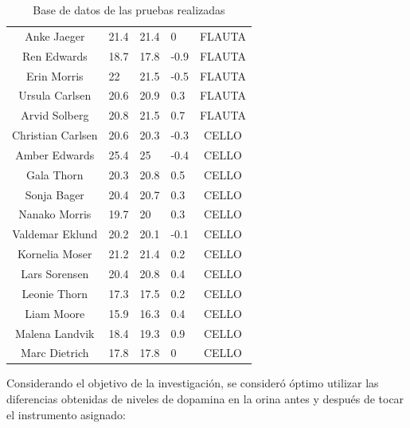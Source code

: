 \begin{table}[H]
\begin{center}
\begin{tabular}{|c |p{2.5cm} |p{2.5cm} |p{3cm}|c|}
            Anke Jaeger & 21.4 & 21.4 & 0 & FLAUTA \\
            Ren Edwards & 18.7 & 17.8 & -0.9 & FLAUTA \\
            Erin Morris & 22 & 21.5 & -0.5 & FLAUTA \\
            Ursula Carlsen & 20.6 & 20.9 & 0.3 & FLAUTA \\
            Arvid Solberg & 20.8 & 21.5 & 0.7 & FLAUTA \\
            Christian Carlsen & 20.6 & 20.3 & -0.3 & CELLO \\
            Amber Edwards & 25.4 & 25 & -0.4 & CELLO \\
            Gala Thorn & 20.3 & 20.8 & 0.5 & CELLO \\
            Sonja Bager & 20.4 & 20.7 & 0.3 & CELLO \\
            Nanako Morris & 19.7 & 20 & 0.3 & CELLO \\
            Valdemar Eklund & 20.2 & 20.1 & -0.1 & CELLO \\
            Kornelia Moser & 21.2 & 21.4 & 0.2 & CELLO \\
            Lars Sorensen & 20.4 & 20.8 & 0.4 & CELLO \\
            Leonie Thorn & 17.3 & 17.5 & 0.2 & CELLO \\
            Liam Moore & 15.9 & 16.3 & 0.4 & CELLO \\
            Malena Landvik & 18.4 & 19.3 & 0.9 & CELLO \\
            Marc Dietrich & 17.8 & 17.8 & 0 & CELLO \\
            \hline
        \end{tabular}
        \caption{Base de datos de las pruebas realizadas}
    \end{center}
\end{table}


Considerando el objetivo de la investigación, se consideró óptimo utilizar las diferencias obtenidas de niveles de dopamina en la orina antes y después de tocar el instrumento asignado:

